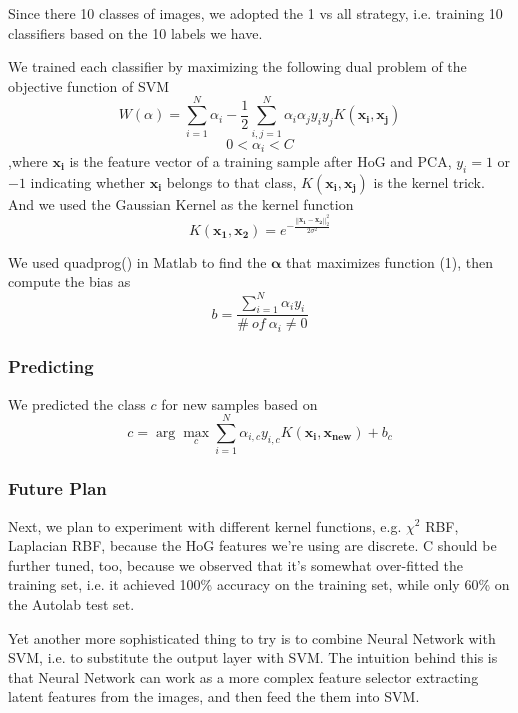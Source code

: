 \documentclass{article} %
\begin{document}
Since there 10 classes of images, we adopted the 1 vs all strategy, i.e. training 10 classifiers based on the 10 labels we have.

We trained each classifier by maximizing the following dual problem of the objective function of SVM
\begin{equation}
W(\alpha)=\sum_{i=1}^{N}\alpha_{i}-\frac{1}{2}\sum_{i,j=1}^{N}\alpha_{i}\alpha_{j}y_{i}y_{j}K(\mathbf{x_{i}},\mathbf{x_{j}})
\end{equation}
\begin{equation}
0<\alpha_{i}<C
\end{equation}
,where $\mathbf{x_{i}}$ is the feature vector of a training sample after HoG and PCA, $y_{i}=1$ or $-1$ indicating whether $\mathbf{x_{i}}$ belongs to that class, $K(\mathbf{x_{i}},\mathbf{x_{j}})$ is the kernel trick. And we used the Gaussian Kernel as the kernel function
\begin{equation}
K(\mathbf{x_{1}},\mathbf{x_{2}})=e^{-\frac{||\mathbf{x_{1}}-\mathbf{x_{2}}||^{2}_{2}}{2\sigma^{2}}}
\end{equation}

We used quadprog() in Matlab to find the $\mathbf{\alpha}$ that maximizes function (1), then compute the bias as
\begin{equation}
b=\frac{\sum_{i=1}^{N}\alpha_{i}y_{i}}{\#~of~\alpha_{i}\neq{0}}
\end{equation}

\subsubsection{Predicting}

We predicted the class $c$ for new samples based on
\begin{equation}
c=\arg\max_{c}\sum_{i=1}^{N}\alpha_{i,c}y_{i,c}K(\mathbf{x_{i}},\mathbf{x_{new}})+b_{c}
\end{equation}

\subsubsection{Future Plan}
Next, we plan to experiment with different kernel functions, e.g. $\chi^{2}$ RBF, Laplacian RBF, because the HoG features we're using are discrete. C should be further tuned, too, because we observed that it's somewhat over-fitted the training set, i.e. it achieved 100\% accuracy on the training set, while only 60\% on the Autolab test set.

Yet another more sophisticated thing to try is to combine Neural Network with SVM, i.e. to substitute the output layer with SVM. The intuition behind this is that Neural Network can work as a more complex feature selector extracting latent features from the images, and then feed the them into SVM.
\end{document}
